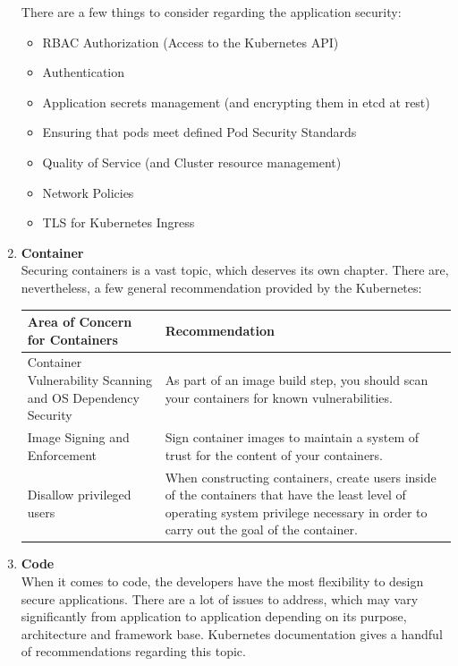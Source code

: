 \begin{enumerate}
There are a few things to consider regarding the application security:
\begin{itemize}
\item RBAC Authorization (Access to the Kubernetes API)
\item Authentication	
\item Application secrets management (and encrypting them in etcd at rest)
\item Ensuring that pods meet defined Pod Security Standards
\item Quality of Service (and Cluster resource management)
\item Network Policies
\item TLS for Kubernetes Ingress
\end{itemize}

\item \textbf{Container} \\
Securing containers is a vast topic, which deserves its own chapter. There are, nevertheless, a few general recommendation provided by the Kubernetes: 

\begin{center}
    \begin{tabular}{ | m{16em} | m{16em} | } 
     \hline
     \textbf{Area of Concern for Containers} & \textbf{Recommendation} \\ 
     \hline
     Container Vulnerability Scanning and OS Dependency Security & As part of an image build step, you should scan your containers for known vulnerabilities. \\ 
     \hline
     Image Signing and Enforcement & Sign container images to maintain a system of trust for the content of your containers. \\ 
     \hline
     Disallow privileged users & When constructing containers, create users inside of the containers that have the least level of operating system privilege necessary in order to carry out the goal of the container. \\
     \hline
    \end{tabular}
\end{center}

\item \textbf{Code} \\
When it comes to code, the developers have the most flexibility to design secure applications. There are a lot of issues to address, which may vary significantly from application to application depending on its purpose, architecture and framework base. Kubernetes documentation gives a handful of recommendations regarding this topic.


\end{enumerate}
